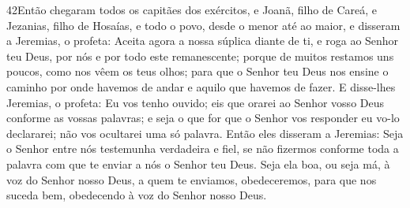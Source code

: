 \medskip

\lettrine{42} Então chegaram todos os capitães dos exércitos,
e Joanã, filho de Careá, e Jezanias, filho de Hosaías, e todo o
povo, desde o menor até ao maior, e disseram a Jeremias, o
profeta: Aceita agora a nossa súplica diante de ti, e roga ao Senhor
teu Deus, por nós e por todo este remanescente; porque de muitos
restamos uns poucos, como nos vêem os teus olhos; para que o
Senhor teu Deus nos ensine o caminho por onde havemos de andar e
aquilo que havemos de fazer. E disse-lhes Jeremias, o profeta:
Eu vos tenho ouvido; eis que orarei ao Senhor vosso Deus conforme as
vossas palavras; e seja o que for que o Senhor vos responder eu
vo-lo declararei; não vos ocultarei uma só palavra. Então eles
disseram a Jeremias: Seja o Senhor entre nós testemunha verdadeira e
fiel, se não fizermos conforme toda a palavra com que te enviar a
nós o Senhor teu Deus. Seja ela boa, ou seja má, à voz do Senhor
nosso Deus, a quem te enviamos, obedeceremos, para que nos suceda
bem, obedecendo à voz do Senhor nosso Deus.

